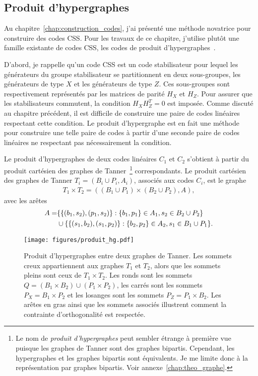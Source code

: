 \subsection{Produit d'hypergraphes}

Au chapitre~\ref{chap:construction_codes},
j'ai présenté une méthode novatrice pour construire des codes CSS.
Pour les travaux de ce chapitre,
j'utilise plutôt une famille existante de codes CSS,
les codes de produit d'hypergraphes~\cite{tillich_quantum_2014}.

D'abord,
je rappelle qu'un code CSS est un code stabilisateur pour lequel les générateurs du groupe
stabilisateur se partitionnent en deux sous-groupes, 
les générateurs de type $X$ et les générateurs de type $Z$.
Ces sous-groupes sont respectivement représentés par les matrices de parité $H_X$ et $H_Z$.
Pour assurer que les stabilisateurs commutent,
la condition $H_X H_Z^T = 0$ est imposée.
Comme discuté au chapitre précédent,
il est difficile de construire une paire de codes linéaires
respectant cette condition.
Le produit d'hypergraphe est en fait une méthode pour construire
une telle paire de codes à partir d'une seconde paire de codes linéaires
ne respectant pas nécessairement la condition.

Le produit d'hypergraphes de deux codes linéaires $C_1$ et $C_2$
s'obtient à partir du produit cartésien des graphes de 
Tanner~\footnote{Le nom de \textit{produit d'hypergraphes} peut sembler étrange à première
vue puisque les graphes de Tanner sont des graphes bipartis. Cependant, les hypergraphes et les graphes
bipartis sont équivalents. Je me limite donc à la représentation par graphes bipartis.
Voir annexe~\ref{chap:theo_graphe}.} correspondants.
Le produit cartésien des graphes de Tanner $T_i = (B_i \cup P_i, A_i)$,
associés aux codes $C_i$, 
est le graphe 
\begin{align}
	T_1 \times T_2 = ((B_1 \cup P_1) \times (B_2 \cup P_2), A),
\end{align}
avec les arêtes 
\begin{align}
	A = 
	&\qty{
		\qty{(b_1, s_2), (p_1, s_2)} :
		\qty{b_1, p_1} \in A_1, s_2 \in B_2 \cup P_2
	} 
	\notag\\
	&\cup
	\qty{
		\qty{(s_1, b_2), (s_1, p_2)} :
		\qty{b_2, p_2} \in A_2, s_1 \in B_1 \cup P_1
	}.
\end{align}

\begin{figure}
	\centering
	\texttt{[image: figures/produit\_hg.pdf]}
	\caption[Produit d'hypergraphes]{
		Produit d'hypergraphes entre deux graphes de Tanner.
		Les sommets creux appartiennent aux graphes $T_1$ et $T_2$,
		alors que les sommets pleins sont ceux de $T_1 \times T_2$.
		Les ronds sont les sommets $Q = (B_1 \times B_2) \cup (P_1 \times P_2)$,
		les carrés sont les sommets $P_X = B_1 \times P_2$
		et les losanges sont les sommets $P_Z = P_1 \times B_2$.
		Les arêtes en gras ainsi que les sommets associés illustrent comment
		la contrainte d'orthogonalité est respectée.
	}
	\label{fig:produit_hg}
\end{figure}

